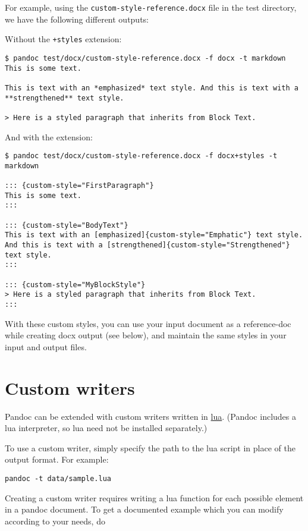 \documentclass[
]{article}
\begin{document}
For example, using the \texttt{custom-style-reference.docx} file in the
test directory, we have the following different outputs:

Without the \texttt{+styles} extension:

\begin{verbatim}
$ pandoc test/docx/custom-style-reference.docx -f docx -t markdown
This is some text.

This is text with an *emphasized* text style. And this is text with a
**strengthened** text style.

> Here is a styled paragraph that inherits from Block Text.
\end{verbatim}

And with the extension:

\begin{verbatim}
$ pandoc test/docx/custom-style-reference.docx -f docx+styles -t markdown

::: {custom-style="FirstParagraph"}
This is some text.
:::

::: {custom-style="BodyText"}
This is text with an [emphasized]{custom-style="Emphatic"} text style.
And this is text with a [strengthened]{custom-style="Strengthened"}
text style.
:::

::: {custom-style="MyBlockStyle"}
> Here is a styled paragraph that inherits from Block Text.
:::
\end{verbatim}

With these custom styles, you can use your input document as a
reference-doc while creating docx output (see below), and maintain the
same styles in your input and output files.

\hypertarget{custom-writers}{%
\section{Custom writers}\label{custom-writers}}

Pandoc can be extended with custom writers written in
\href{http://www.lua.org}{lua}. (Pandoc includes a lua interpreter, so
lua need not be installed separately.)

To use a custom writer, simply specify the path to the lua script in
place of the output format. For example:

\begin{verbatim}
pandoc -t data/sample.lua
\end{verbatim}

Creating a custom writer requires writing a lua function for each
possible element in a pandoc document. To get a documented example which
you can modify according to your needs, do
\end{document}

